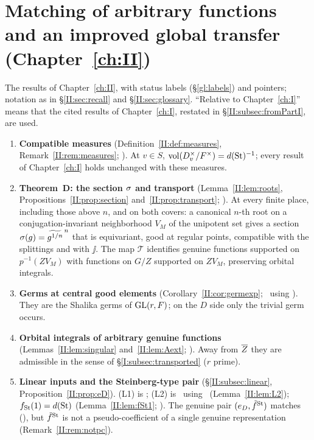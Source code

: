 \section{\texorpdfstring{Matching of arbitrary functions and an improved global transfer (Chapter~\ref{ch:II})}{Matching of arbitrary functions and an improved global transfer (Chapter 5)}}\label{II:sec:summary}
The results of Chapter~\ref{ch:II}, with status labels (\S\ref{gl:labels}) and pointers; notation as in \S\ref{II:sec:recall} and \S\ref{II:sec:glossary}. ``Relative to Chapter~\ref{ch:I}'' means that the cited results of Chapter~\ref{ch:I}, restated in \S\ref{II:subsec:fromPartI}, are used.

\begin{enumerate}[leftmargin=*,label=\arabic*.]
\item \textbf{Compatible measures} (Definition~\ref{II:def:measures}, Remark~\ref{II:rem:measures}; \Pv). At $v\in S$, $\operatorname{vol}(D_v^\times/F^\times)=d(\mathrm{St})^{-1}$; every result of Chapter~\ref{ch:I} holds unchanged with these measures.
\item \textbf{Theorem~D: the section $\sigma$ and transport} (Lemma~\ref{II:lem:roots}, Propositions~\ref{II:prop:section} and~\ref{II:prop:transport}; \Pv). At every finite place, including those above $n$, and on both covers: a canonical $n$-th root on a conjugation-invariant neighborhood $V_M$ of the unipotent set gives a section $\sigma(g)=\widetilde{g^{1/n}}^{\,n}$ that is equivariant, good at regular points, compatible with the splittings and with $\jj$. The map $\mathcal T$ identifies genuine functions supported on $p^{-1}(ZV_M)$ with functions on $G/Z$ supported on $ZV_M$, preserving orbital integrals.
\item \textbf{Germs at central good elements} (Corollary~\ref{II:cor:germexp}; \Pv\ using \Ev). They are the Shalika germs of $\operatorname{GL}(r,F)$; on the $D$ side only the trivial germ occurs.
\item \textbf{Orbital integrals of arbitrary genuine functions} (Lemmas~\ref{II:lem:singular} and~\ref{II:lem:Aext}; \Pv). Away from $\overline{Z}$ they are admissible in the sense of \S\ref{I:subsec:transported} ($r$ prime).
\item \textbf{Linear inputs and the Steinberg-type pair} (\S\ref{II:subsec:linear}, Proposition~\ref{II:prop:eD}). (L1) is \Ev; (L2) is \Pv\ using \Ev\ (Lemma~\ref{II:lem:L2}); $f_{\mathrm{St}}(1)=d(\mathrm{St})$ (Lemma~\ref{II:lem:fSt1}; \Pv). The genuine pair $(e_D,\tilde f^{\mathrm{St}})$ matches (\Pv), but $\tilde f^{\mathrm{St}}$ is not a pseudo-coefficient of a single genuine representation (Remark~\ref{II:rem:notpc}).

\end{enumerate}
